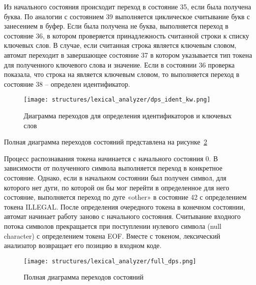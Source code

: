 Из начального состояния происходит переход в состояние 35, если была получена буква.
По аналогии с состоянием 39 выполняется циклическое считывание букв с занесением в буфер.
Если была получена не буква, выполняется переход в состояние 36, в котором проверяется принадлежность считанной строки к списку ключевых слов.
В случае, если считанная строка является ключевым словом, автомат переходит в завершающее состояние 37 в котором указывается тип токена для полученного ключевого слова и значение.
Если в состоянии 36 проверка показала, что строка на является ключевым словом, то выполняется переход в состояние 38 – определен идентификатор.

\begin{figure}[ht]
	\centering
	\texttt{[image: structures/lexical\_analyzer/dps\_ident\_kw.png]}
	\caption{Диаграмма переходов для определения идентификаторов и ключевых слов}
	\label{f:dps_ident_kw}
\end{figure}

Полная диаграмма переходов состояний представлена на рисунке~\ref{f:full_dps}

Процесс распознавания токена начинается с начального состояния 0.
В зависимости от полученного символа выполняется переход в конкретное состояние.
Однако, если в начальном состоянии был получен символ, для которого нет дуги,
по которой он бы мог перейти в определенное для него состояние, выполняется переход по дуге «other» в состояние 42 с определением токена ILLEGAL.
После определения очередного токена в конечном состоянии, автомат начинает работу заново с начального состояния.
Считывание входного потока символов прекращается при поступлении нулевого символа (null character) с определением токена EOF.
Вместе с токеном, лексический анализатор возвращает его позицию в входном коде.


\clearpage

\begin{figure}[h!]
	\centering
	\texttt{[image: structures/lexical\_analyzer/full\_dps.png]}
	\caption{Полная диаграмма переходов состояний}
	\label{f:full_dps}
\end{figure}

\clearpage